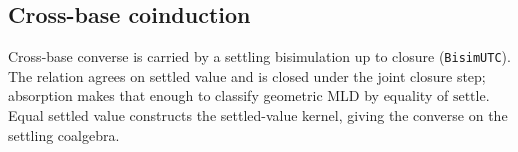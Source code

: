 \subsection{Cross-base coinduction}

\begin{theorem}\label{thm:coalgebraic-crossbase-mld}\leanok{}
Cross-base converse is carried by a settling bisimulation up to closure
(\texttt{BisimUTC}).  The relation agrees on settled value and is closed under
the joint closure step; absorption makes that enough to classify geometric MLD
by equality of \(\mathrm{settle}\).  Equal settled value constructs the
settled-value kernel, giving the converse on the settling coalgebra.
\end{theorem}

